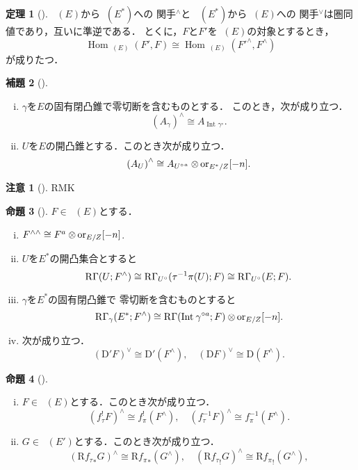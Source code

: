 \documentclass[uplatex,dvipdfmx,a4paper,10pt,draft]{jsarticle}
\theoremstyle{definition}
\newcommand{\rr}{\mathbf{R}}
\newcommand{\Hom}{\mathop{\mathrm{Hom}}\nolimits} %
\numberwithin{equation}{section}
\newcommand{\RG}{\mathop{\mathrm{R}\hspace{-0pt}\Gamma}\nolimits}
\newcommand{\Rder}{\mathrm{R}}
\newcommand{\rmD}{\mathrm{D}}
\newcommand{\ori}{\mathord{\mathrm{or}}}
\newcommand{\tens}[1][]{\mathbin{\otimes_{\raise1.5ex\hbox to-.1em{}{#1}}}}
\theoremstyle{mystyle}
\newtheorem{RMK}[AXM]{注意}
\newtheorem{mythm}{定理}[section]
\newtheorem{mylmm}[mythm]{補題}
\newtheorem{myprp}[mythm]{命題}
\newenvironment{thm}{\begin{thmbox}\begin{mythm}}{\end{mythm}\end{thmbox}}
\newenvironment{lmm}{\begin{lmmbox}\begin{mylmm}}{\end{mylmm}\end{lmmbox}}
\newenvironment{prp}{\begin{prpbox}\begin{myprp}}{\end{myprp}\end{prpbox}}
\newcommand{\Dlcon}{\mathop{\mathsf{D}^{+}_{\rr_{>0}}}\nolimits}
\newcommand{\Int}[1][]{\mathop{\mathrm{Int}}\nolimits_{#1}}
\begin{document}
\begin{thm}[{\cite[Theorem 3.7.9]{KS90}}]
    \(\Dlcon(E)\)から\(\Dlcon(E^\ast)\)への
    関手\({}^{\wedge}\)と
    \(\Dlcon(E^\ast)\)から\(\Dlcon(E)\)への
    関手\({}^{\vee}\)は圏同値であり，互いに準逆である．
    とくに，\(F\)と\(F'\)を\(\Dlcon(E)\)の対象とするとき，
    \[
        \Hom_{\Dlcon(E)}(F',F)\cong
        \Hom_{\Dlcon(E)}(F'^{\wedge},F^{\wedge})
    \]
    が成りたつ．
\end{thm}
\begin{lmm}[{\cite[Lemma 3.7.10]{KS90}}]
    \begin{enumerate}[(i)]
        \item \(\gamma\)を\(E\)の固有閉凸錐で零切断を含むものとする．
        このとき，次が成り立つ．\[
            \left(A_\gamma\right)^\wedge
            \cong A_{\Int{\gamma^\circ}}.
        \]
        \item \(U\)を\(E\)の開凸錐とする．このとき次が成り立つ．
        \[
            \left(A_U\right)^\wedge\cong
            A_{{U^{\circ}}^a}\tens \ori_{E^\ast/Z}[-n].
        \]
    \end{enumerate}
\end{lmm}
\begin{RMK}[{\cite[Remark 3.7.11]{KS90}}]
    RMK
\end{RMK}
\begin{prp}[{\cite[Proposition 3.7.12]{KS90}}]
    \(F\in\Dlcon(E)\)とする．
    \begin{enumerate}[(i)]
        \item \(F^{\wedge\wedge}\cong F^a\tens \ori_{E/Z}[-n]\).
        \item \(U\)を\(E^\ast\)の開凸集合とすると\[
            \RG(U;F^\wedge)
            \cong\RG_{U^\circ}(\tau^{-1}\pi(U);F)
            \cong\RG_{U^\circ}(E;F).
        \]
        \item \(\gamma\)を\(E^\ast\)の固有閉凸錐で
        零切断を含むものとすると\[
            \RG_{\gamma}(E^\ast;F^\wedge)
            \cong
            \RG(\Int{\gamma^{\circ a}};F)\tens\ori_{E/Z}[-n].
        \]
        \item 次が成り立つ．\[
            \left(\rmD'F\right)^\vee\cong\rmD'(F^\wedge),
            \quad
            \left(\rmD F\right)^\vee\cong\rmD(F^\wedge).
            \]
    \end{enumerate}
\end{prp}
\begin{prp}[{\cite[Proposition 3.7.13]{KS90}}]
    \begin{enumerate}[(i)]
        \item \(F\in\Dlcon(E)\)とする．このとき次が成り立つ．\[
            (f_\tau^!F)^\wedge\cong f_\pi^!(F^\wedge),
            \quad
            (f_\tau^{-1}F)^\wedge\cong f_\pi^{-1}(F^\wedge).
            \]
        \item \(G\in\Dlcon(E')\)とする．このとき次が成り立つ．\[
            (\Rder{f_\tau}_\ast G)^\wedge\cong \Rder{f_\pi}_\ast(G^\wedge),
            \quad
            (\Rder{f_\tau}_! G)^\wedge\cong \Rder{f_\pi}_!(G^\wedge),
            \]
    \end{enumerate}
\end{prp}
\end{document}
